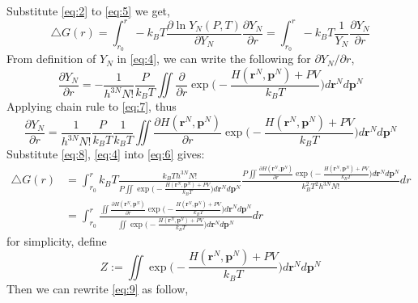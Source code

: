 \documentclass[a4paper,9pt]{article}
\begin{document}
\begin{enumerate}
\begin{equation}
		\end{equation}
		Substitute \eqref{eq:2} to \eqref{eq:5} we get,
		\begin{equation}\label{eq:6}
		\triangle G(r) = \int_{r_0}^{r} -k_B T \frac{\partial \ln Y_N(P,T) }{\partial Y_N} \frac{\partial Y_N}{\partial r} = \int_{r_0}^{r} -k_B T \frac{1}{Y_N} \frac{\partial Y_N}{\partial r}
		\end{equation}
		From definition of $Y_N$ in \eqref{eq:4}, we can write the following for $\partial Y_N / \partial r$,
		\begin{equation}\label{eq:7}
		\frac{\partial Y_N}{\partial r} = -\frac{1}{h^{3N}N!}\frac{P}{k_B T} \iint \frac{\partial}{\partial r} \exp\bigg(-\frac{H(\textbf{r}^N,\textbf{p}^N) + PV}{k_B T}\bigg)d\textbf{r}^N d\textbf{p}^N
		\end{equation}
		Applying chain rule to \eqref{eq:7}, thus
		\begin{equation}\label{eq:8}
		\frac{\partial Y_N}{\partial r} = \frac{1}{h^{3N}N!}\frac{P}{k_B T}\frac{1}{k_B T} \iint \frac{\partial H(\textbf{r}^N,\textbf{p}^N)}{\partial r} \exp\bigg(-\frac{H(\textbf{r}^N,\textbf{p}^N) + PV}{k_B T}\bigg)d\textbf{r}^N d\textbf{p}^N
		\end{equation}
		Substitute \eqref{eq:8}, \eqref{eq:4} into \eqref{eq:6} gives:
		\begin{equation}\label{eq:9}
		\begin{aligned}
		\triangle G(r) &= \int_{r_0}^{r} k_B T \frac{k_B T h^{3N}N!}{P \iint\exp\bigg(-\frac{H(\textbf{r}^N,\textbf{p}^N) + PV}{k_B T}\bigg)d\textbf{r}^N d\textbf{p}^N} \frac{P \iint \frac{\partial H(\textbf{r}^N,\textbf{p}^N)}{\partial r} \exp\bigg(-\frac{H(\textbf{r}^N,\textbf{p}^N) + PV}{k_B T}\bigg)d\textbf{r}^N d\textbf{p}^N}{k_B^2 T^2 h^{3N}N!} dr\\
		&= \int_{r_0}^{r} \frac{\iint \frac{\partial H(\textbf{r}^N,\textbf{p}^N)}{\partial r} \exp\bigg(-\frac{H(\textbf{r}^N,\textbf{p}^N) + PV}{k_B T}\bigg)d\textbf{r}^N d\textbf{p}^N}{ \iint\exp\bigg(-\frac{H(\textbf{r}^N,\textbf{p}^N) + PV}{k_B T}\bigg)d\textbf{r}^N d\textbf{p}^N} dr
		\end{aligned}
		\end{equation}
		for simplicity, define
		\begin{equation}\label{eq:10}
		Z := \iint\exp\bigg(-\frac{H(\textbf{r}^N,\textbf{p}^N) + PV}{k_B T}\bigg)d\textbf{r}^N d\textbf{p}^N
		\end{equation}
		Then we can rewrite \eqref{eq:9} as follow,
		\begin{equation}\label{eq:11}

\end{equation}
\end{enumerate}
\end{document}
